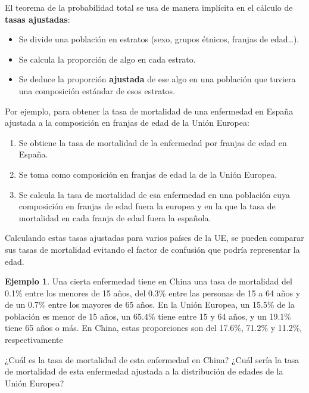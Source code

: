 \documentclass[
]{book}
\providecommand{\tightlist}{%
  \setlength{\itemsep}{0pt}\setlength{\parskip}{0pt}}
\theoremstyle{definition}
\theoremstyle{definition}
\newtheorem{example}{Ejemplo}[chapter]
\theoremstyle{definition}
\theoremstyle{definition}
\theoremstyle{remark}
\begin{document}
El teorema de la probabilidad total se usa de manera implícita en el cálculo de \textbf{tasas ajustadas}:

\begin{itemize}
\tightlist
\item
  Se divide una población en estratos (sexo, grupos étnicos, franjas de edad\ldots).
\item
  Se calcula la proporción de algo en cada estrato.
\item
  Se deduce la proporción \textbf{ajustada} de ese algo en una población que tuviera una composición estándar de esos estratos.
\end{itemize}

Por ejemplo, para obtener la tasa de mortalidad de una enfermedad en España ajustada a la composición en franjas de edad de la Unión Europea:

\begin{enumerate}
\def\labelenumi{\arabic{enumi}.}
\item
  Se obtiene la tasa de mortalidad de la enfermedad por franjas de edad en España.
\item
  Se toma como composición en franjas de edad la de la Unión Europea.
\item
  Se calcula la tasa de mortalidad de esa enfermedad en una población cuya composición en franjas de edad fuera la europea y en la que la tasa de mortalidad en cada franja de edad fuera la española.
\end{enumerate}

Calculando estas tasas ajustadas para varios países de la UE, se pueden comparar sus tasas de mortalidad evitando el factor de confusión que podría representar la edad.

\begin{example}
\protect\hypertarget{exm:unnamed-chunk-140}{}\label{exm:unnamed-chunk-140}Una cierta enfermedad tiene en China una tasa de mortalidad del 0.1\% entre los menores de 15 años, del 0.3\% entre las personas de 15 a 64 años y de un 0.7\% entre los mayores de 65 años. En la Unión Europea, un 15.5\% de la población es menor de 15 años, un 65.4\% tiene entre 15 y 64 años, y un 19.1\% tiene 65 años o más. En China, estas proporciones son del 17.6\%, 71.2\% y 11.2\%, respectivamente

¿Cuál es la tasa de mortalidad de esta enfermedad en China? ¿Cuál sería la tasa de mortalidad de esta enfermedad ajustada a la distribución de edades de la Unión Europea?
\end{example}
\end{document}
